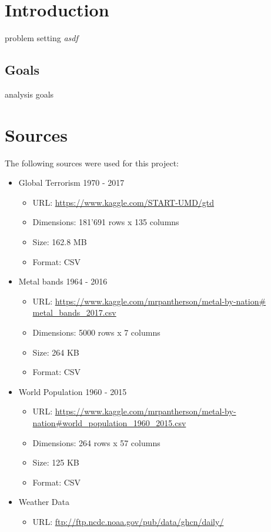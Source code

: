 
\section{Introduction}


problem setting
\emph{asdf}




\subsection{Goals}
analysis goals




\section{Sources}
The following sources were used for this project:
\begin{itemize}
	\item Global Terrorism 1970 - 2017
	\begin{itemize}
		\item URL: \url{https://www.kaggle.com/START-UMD/gtd}
		\item Dimensions: 181'691 rows x 135 columns
		\item Size: 162.8 MB
		\item Format: CSV
	\end{itemize}
	\item Metal bands 1964 - 2016
	\begin{itemize}
		\item URL: \url{https://www.kaggle.com/mrpantherson/metal-by-nation# metal_bands_2017.csv}
		\item Dimensions: 5000 rows x 7 columns
		\item Size: 264 KB
		\item Format: CSV
	\end{itemize}
	\item World Population 1960 - 2015
	\begin{itemize}
		\item URL: \url{https://www.kaggle.com/mrpantherson/metal-by-nation#world_population_1960_2015.csv}
		\item Dimensions: 264 rows x 57 columns
		\item Size: 125 KB
		\item Format: CSV
	\end{itemize}
	\item Weather Data
	\begin{itemize}
		\item URL: \url{ftp://ftp.ncdc.noaa.gov/pub/data/ghcn/daily/}

\end{itemize}
\end{itemize}
